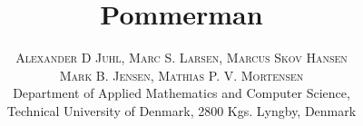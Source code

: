 
\title{\vspace{-15mm}\fontsize{24pt}{10pt}\selectfont\textbf{Pommerman}} %

\author{
\large
\textsc{Alexander D Juhl, Marc S. Larsen, Marcus Skov Hansen} \\ 
\textsc{Mark B. Jensen, Mathias P. V. Mortensen}\\[2mm]%
\normalsize Department of Applied Mathematics and Computer Science,\\
\normalsize Technical University of Denmark, 2800 Kgs. Lyngby, Denmark \\ %
\vspace{-5mm}
}
\date{}


\maketitle %

\thispagestyle{fancy} %